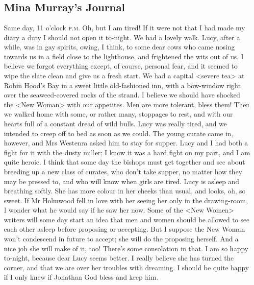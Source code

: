 \chapter[Chapter \thechapter]{}

\section{Mina Murray's Journal}

\begin{diary}{Same day, 11 o'clock \textsc{p.m.}}
Oh, but I am tired! If it were not that I had made my diary a duty I should not open it to-night. We had a lovely walk. Lucy, after a while, was in gay spirits, owing, I think, to some dear cows who came nosing towards us in a field close to the lighthouse, and frightened the wits out of us. I believe we forgot everything except, of course, personal fear, and it seemed to wipe the slate clean and give us a fresh start. We had a capital <severe tea> at Robin Hood's Bay in a sweet little old-fashioned inn, with a bow-window right over the seaweed-covered rocks of the strand. I believe we should have shocked the <New Woman> with our appetites. Men are more tolerant, bless them! Then we walked home with some, or rather many, stoppages to rest, and with our hearts full of a constant dread of wild bulls. Lucy was really tired, and we intended to creep off to bed as soon as we could. The young curate came in, however, and Mrs Westenra asked him to stay for supper. Lucy and I had both a fight for it with the dusty miller; I know it was a hard fight on my part, and I am quite heroic. I think that some day the bishops must get together and see about breeding up a new class of curates, who don't take supper, no matter how they may be pressed to, and who will know when girls are tired. Lucy is asleep and breathing softly. She has more colour in her cheeks than usual, and looks, oh, so sweet. If Mr Holmwood fell in love with her seeing her only in the drawing-room, I wonder what he would say if he saw her now. Some of the <New Women> writers will some day start an idea that men and women should be allowed to see each other asleep before proposing or accepting. But I suppose the New Woman won't condescend in future to accept; she will do the proposing herself. And a nice job she will make of it, too! There's some consolation in that. I am so happy to-night, because dear Lucy seems better. I really believe she has turned the corner, and that we are over her troubles with dreaming. I should be quite happy if I only knew if Jonathan God bless and keep him.
\end{diary}
 

